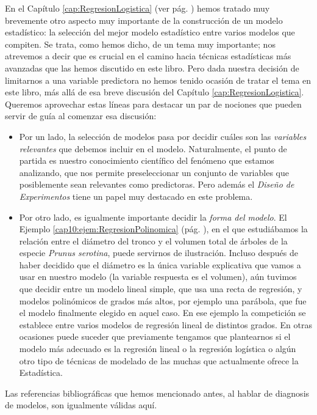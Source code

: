 En el Capítulo \ref{cap:RegresionLogistica} (ver pág. \pageref{cap13:subsubsec:SeleccionModelosDevianza}) hemos tratado muy brevemente otro aspecto muy importante de la construcción de un modelo estadístico: la selección del mejor modelo estadístico entre varios modelos que compiten. Se trata, como hemos dicho, de un tema muy  importante; nos atrevemos a decir que es crucial en el camino hacia técnicas estadísticas más avanzadas que las hemos discutido en este libro. Pero dada nuestra decisión de limitarnos a una variable predictora no hemos tenido ocasión de tratar el tema en este libro, más allá de esa breve discusión del  Capítulo \ref{cap:RegresionLogistica}. Queremos aprovechar estas líneas para destacar un par de nociones que pueden servir de guía al comenzar esa discusión:
\begin{itemize}
  \item Por un lado, la selección de modelos pasa por decidir cuáles son las {\em variables relevantes} que debemos incluir en el modelo. Naturalmente, el punto de partida es nuestro conocimiento científico del fenómeno que estamos analizando, que nos permite preseleccionar un conjunto de variables que posiblemente sean relevantes como predictoras. Pero además el {\em Diseño de Experimentos} tiene un papel muy destacado en este problema.

  \item Por otro lado, es igualmente importante decidir la {\em forma del modelo}. El Ejemplo \ref{cap10:ejem:RegresionPolinomica} (pág. \pageref{cap10:ejem:RegresionPolinomica}), en el que estudiábamos la relación entre el diámetro del tronco y el volumen total de árboles de la especie {\em Prunus serotina}, puede servirnos de ilustración. Incluso después de haber decidido que el diámetro es la única variable explicativa que vamos a usar en nuestro modelo (la variable respuesta es el volumen), aún tuvimos que decidir entre un modelo lineal simple, que usa una recta de regresión, y modelos polinómicos de grados más altos, por ejemplo una parábola, que fue el modelo finalmente elegido en aquel caso. En ese ejemplo la competición se establece entre varios modelos de regresión lineal de distintos grados. En otras ocasiones puede suceder que previamente tengamos  que plantearnos si el modelo más adecuado es la regresión lineal o la regresión logística o algún otro tipo de técnicas de modelado de las muchas que actualmente ofrece la Estadística.
\end{itemize}

Las referencias bibliográficas que hemos mencionado antes, al hablar de diagnosis de modelos, son igualmente válidas aquí.

